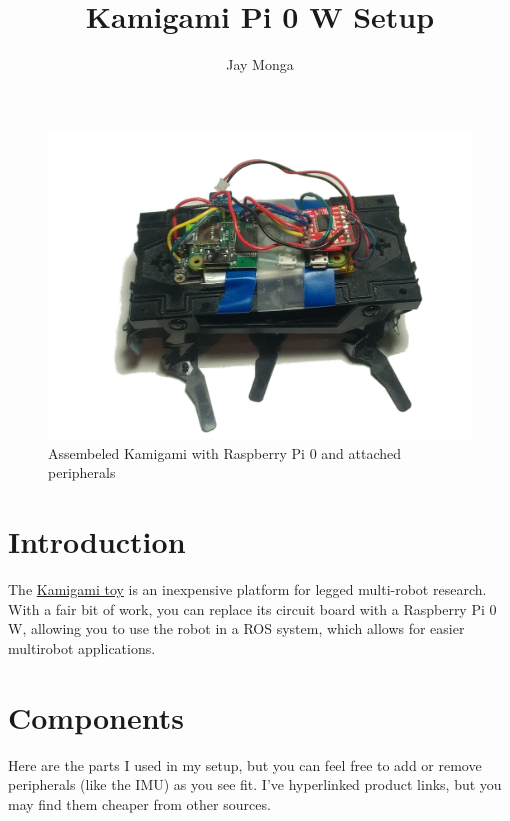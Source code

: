 \documentclass[11pt]{article}
\title{Kamigami Pi 0 W Setup}
\author{Jay Monga}
\date{\datetime}
\begin{document}
\maketitle

\begin{figure}[H]
    \centering
    \includegraphics[width=\textwidth]{images/advert_edit.png}
    \caption{Assembeled Kamigami with Raspberry Pi 0 and attached peripherals}
    \label{fig:kamigami}
\end{figure}

\newpage

\tableofcontents
\newpage

\section{Introduction}
The \href{https://kamigamirobots.com/}{Kamigami toy} is an inexpensive platform for legged multi-robot research. With a fair bit of work, you can replace its circuit board with a Raspberry Pi 0 W, allowing you to use the robot in a ROS system, which allows for easier multirobot applications.

\section{Components} \label{components}

Here are the parts I used in my setup, but you can feel free to add or remove peripherals (like the IMU) as you see fit. I've hyperlinked product links, but you may find them cheaper from other sources.
\end{document}
